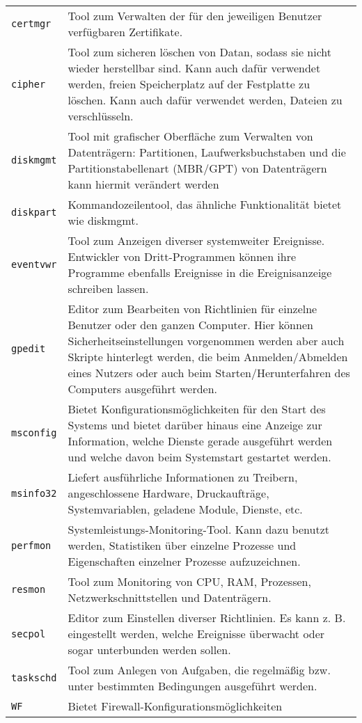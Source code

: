 \begin{multicols}{3}
\begin{tabular}{@{}p{\the\MyLen}%
		@{}p{\linewidth-\the\MyLen}@{}}
	\texttt{certmgr} &  Tool zum Verwalten der für den jeweiligen Benutzer verfügbaren Zertifikate.\\
    \texttt{cipher} &  Tool zum sicheren löschen von Datan, sodass sie nicht wieder herstellbar sind. Kann auch dafür verwendet werden, freien Speicherplatz auf der Festplatte zu löschen. Kann auch dafür verwendet werden, Dateien zu verschlüsseln.\\
	\texttt{diskmgmt} &  Tool mit grafischer Oberfläche zum Verwalten von Datenträgern: Partitionen, Laufwerksbuchstaben und die Partitionstabellenart (MBR/GPT) von Datenträgern kann hiermit verändert werden\\
	\texttt{diskpart} &  Kommandozeilentool, das ähnliche Funktionalität bietet wie diskmgmt.\\
	\texttt{eventvwr} & Tool zum Anzeigen diverser systemweiter Ereignisse. Entwickler von Dritt-Programmen können ihre Programme ebenfalls Ereignisse in die Ereignisanzeige schreiben lassen.\\
	\texttt{gpedit} & Editor zum Bearbeiten von Richtlinien für einzelne Benutzer oder den ganzen Computer. Hier können Sicherheitseinstellungen vorgenommen werden aber auch Skripte hinterlegt werden, die beim Anmelden/Abmelden eines Nutzers oder auch beim Starten/Herunterfahren des Computers ausgeführt werden.\\
	\texttt{msconfig} & Bietet Konfigurationsmöglichkeiten für den Start des Systems und bietet darüber hinaus eine Anzeige zur Information, welche Dienste gerade ausgeführt werden und welche davon beim Systemstart gestartet werden.\\
	\texttt{msinfo32} & Liefert ausführliche Informationen zu Treibern, angeschlossene Hardware, Druckaufträge, Systemvariablen, geladene Module, Dienste, etc.\\
	\texttt{perfmon} & Systemleistungs-Monitoring-Tool. Kann dazu benutzt werden, Statistiken über einzelne Prozesse und Eigenschaften einzelner Prozesse aufzuzeichnen.\\
	\texttt{resmon} & Tool zum Monitoring von CPU, RAM, Prozessen, Netzwerkschnittstellen und Datenträgern.\\
	\texttt{secpol} & Editor zum Einstellen diverser Richtlinien. Es kann z. B. eingestellt werden, welche Ereignisse überwacht oder sogar unterbunden werden sollen.\\
	\texttt{taskschd} & Tool zum Anlegen von Aufgaben, die regelmäßig bzw. unter bestimmten Bedingungen ausgeführt werden.\\
	\texttt{WF} &  Bietet Firewall-Konfigurationsmöglichkeiten
	\end{tabular}

\end{multicols}
